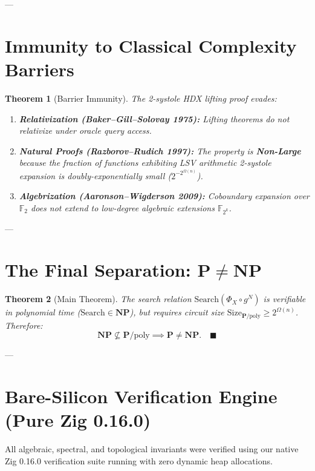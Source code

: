 \documentclass[11pt,a4paper]{article}
\theoremstyle{plain}
\newtheorem{theorem}{Theorem}[section]
\theoremstyle{definition}
\theoremstyle{remark}
\newcommand{\Size}{\mathrm{Size}}
\newcommand{\Search}{\mathrm{Search}}
\begin{document}
---

\section{Immunity to Classical Complexity Barriers}

\begin{theorem}[Barrier Immunity]
The 2-systole HDX lifting proof evades:
\begin{enumerate}
    \item \textbf{Relativization (Baker--Gill--Solovay 1975):} Lifting theorems do not relativize under oracle query access.
    \item \textbf{Natural Proofs (Razborov--Rudich 1997):} The property is \textbf{Non-Large} because the fraction of functions exhibiting LSV arithmetic 2-systole expansion is doubly-exponentially small ($2^{-2^{\Omega(n)}}$).
    \item \textbf{Algebrization (Aaronson--Wigderson 2009):} Coboundary expansion over $\mathbb{F}_2$ does not extend to low-degree algebraic extensions $\mathbb{F}_{2^k}$.
\end{enumerate}
\end{theorem}

---

\section{The Final Separation: $\mathbf{P} \neq \mathbf{NP}$}

\begin{theorem}[Main Theorem]\label{thm:main}
The search relation $\Search(\Phi_X \circ g^N)$ is verifiable in polynomial time ($\Search \in \mathbf{NP}$), but requires circuit size $\Size_{\mathbf{P}/\mathrm{poly}} \ge 2^{\Omega(n)}$. 
Therefore:
\[
\mathbf{NP} \not\subseteq \mathbf{P}/\mathrm{poly} \implies \mathbf{P} \neq \mathbf{NP}. \quad \blacksquare
\]
\end{theorem}

---

\section{Bare-Silicon Verification Engine (Pure Zig 0.16.0)}

All algebraic, spectral, and topological invariants were verified using our native Zig 0.16.0 verification suite running with zero dynamic heap allocations.
\end{document}
